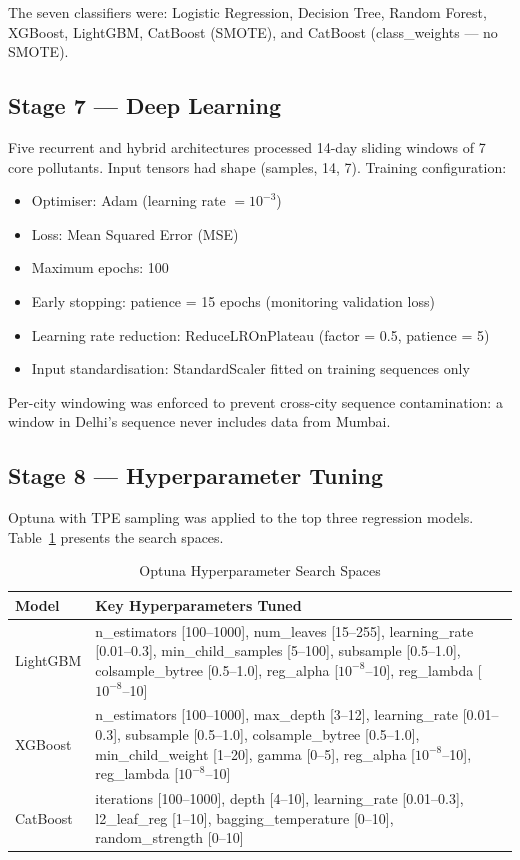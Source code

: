 \documentclass[12pt,a4paper]{report}
\begin{document}
The seven classifiers were: Logistic Regression, Decision Tree, Random Forest, XGBoost, LightGBM, CatBoost (SMOTE), and CatBoost (class\_weights --- no SMOTE).

\subsection{Stage 7 --- Deep Learning}

Five recurrent and hybrid architectures processed 14-day sliding windows of 7 core pollutants. Input tensors had shape (samples, 14, 7). Training configuration:
\begin{itemize}
    \item Optimiser: Adam (learning rate $= 10^{-3}$)
    \item Loss: Mean Squared Error (MSE)
    \item Maximum epochs: 100
    \item Early stopping: patience = 15 epochs (monitoring validation loss)
    \item Learning rate reduction: ReduceLROnPlateau (factor = 0.5, patience = 5)
    \item Input standardisation: StandardScaler fitted on training sequences only
\end{itemize}

Per-city windowing was enforced to prevent cross-city sequence contamination: a window in Delhi's sequence never includes data from Mumbai.

\subsection{Stage 8 --- Hyperparameter Tuning}

Optuna with TPE sampling was applied to the top three regression models. Table~\ref{tab:search_space} presents the search spaces.

\begin{table}[H]
\centering
\caption{Optuna Hyperparameter Search Spaces}
\label{tab:search_space}
\small
\begin{tabular}{|l|p{10cm}|}
\hline
\textbf{Model} & \textbf{Key Hyperparameters Tuned} \\
\hline
LightGBM & n\_estimators [100--1000], num\_leaves [15--255], learning\_rate [0.01--0.3], min\_child\_samples [5--100], subsample [0.5--1.0], colsample\_bytree [0.5--1.0], reg\_alpha [$10^{-8}$--10], reg\_lambda [$10^{-8}$--10] \\
\hline
XGBoost & n\_estimators [100--1000], max\_depth [3--12], learning\_rate [0.01--0.3], subsample [0.5--1.0], colsample\_bytree [0.5--1.0], min\_child\_weight [1--20], gamma [0--5], reg\_alpha [$10^{-8}$--10], reg\_lambda [$10^{-8}$--10] \\
\hline
CatBoost & iterations [100--1000], depth [4--10], learning\_rate [0.01--0.3], l2\_leaf\_reg [1--10], bagging\_temperature [0--10], random\_strength [0--10] \\
\hline
\end{tabular}
\end{table}
\end{document}
